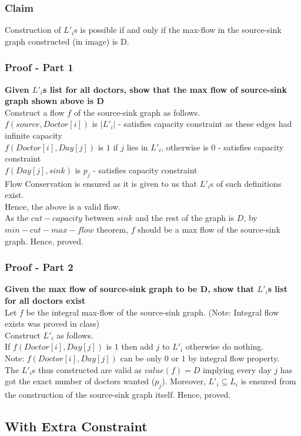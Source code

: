 \documentclass{article}
\begin{document}
\subsubsection{Claim}
Construction of $L'_i$s is possible if and only if the max-flow in the source-sink graph constructed (in image) is D.
\subsubsection{Proof - Part 1}
{\bf Given $L'_i$s list for all doctors, show that the max flow of source-sink graph shown above is D \\}
Construct a flow $f$ of the source-sink graph as follows. \\
$f(source,Doctor[i])$ is $|L'_i|$ - satisfies capacity constraint as these edges had infinite capacity \\
$f(Doctor[i], Day[j])$ is $1$ if $j$ lies in $L'_i$, otherwise is $0$ - satisfies capacity constraint \\
$f(Day[j],sink)$ is $p_j$ - satisfies capacity constraint \\
Flow Conservation is ensured as it is given to us that $L'_i$s of such definitions exist. \\
Hence, the above is a valid flow. \\
As the $cut-capacity$ between $sink$ and the rest of the graph is $D$, by $min-cut - max-flow$ theorem, $f$ should be a max flow of the source-sink graph. Hence, proved. 
\subsubsection{Proof - Part 2}
{\bf Given the max flow of source-sink graph to be D, show that $L'_i$s list for all doctors exist \\}
Let $f$ be the integral max-flow of the source-sink graph. (Note: Integral flow exists was proved in class) \\
Construct $L'_i$ as follows. \\
If $f(Doctor[i], Day[j])$ is $1$ then add $j$ to $L'_i$ otherwise do nothing. \\
Note: $f(Doctor[i], Day[j])$ can be only $0$ or $1$ by integral flow property. \\
The $L'_i$s thus constructed are valid as $value(f) = D$ implying every day $j$ has got the exact number of doctors wanted ($p_j$). Moreover, $L'_i \subseteq L_i$ is ensured from the construction of the source-sink graph itself. Hence, proved.
\newpage
\subsection{With Extra Constraint}
\end{document}
